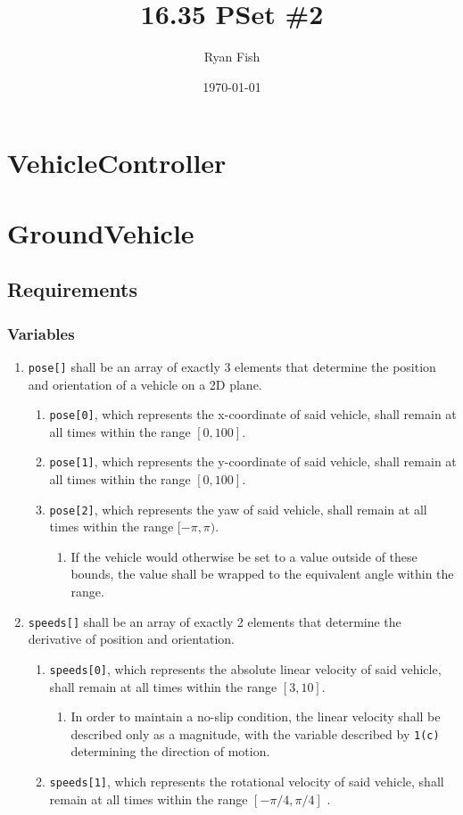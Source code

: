 \documentclass{article}
\title{16.35 PSet \#2}
\author{Ryan Fish}
\date{\today}
\begin{document}
\maketitle

\section{VehicleController}

\section{GroundVehicle}
\subsection{Requirements}
\subsubsection{Variables}
\begin{enumerate}
	\item \verb|pose[]| shall be an array of exactly 3 elements that determine the position and orientation of a vehicle on a 2D plane.
	\begin{enumerate}
		\item \verb|pose[0]|, which represents the x-coordinate of said vehicle, shall remain at all times within the range $[0,100]$.
		\item \verb|pose[1]|, which represents the y-coordinate of said vehicle, shall remain at all times within the range $[0,100]$.
		\item \verb|pose[2]|, which represents the yaw of said vehicle, shall remain at all times within the range $[-\pi, \pi)$.
		\begin{enumerate}
			\item If the vehicle would otherwise be set to a value outside of these bounds, the value shall be wrapped to the equivalent angle within the range.
		\end{enumerate}
	\end{enumerate}
	\item \verb|speeds[]| shall be an array of exactly 2 elements that determine the derivative of position and orientation.
	\begin{enumerate}
		\item \verb|speeds[0]|, which represents the absolute linear velocity of said vehicle, shall remain at all times within the range $[3,10]$.
		\begin{enumerate}
			\item In order to maintain a no-slip condition, the linear velocity shall be described only as a magnitude, with the variable described by \verb|1(c)| determining the direction of motion.
		\end{enumerate}
		\item \verb|speeds[1]|, which represents the rotational velocity of said vehicle, shall remain at all times within the range $[-\pi/4,\pi/4]$ .
	\end{enumerate}
\end{enumerate}
\end{document}
